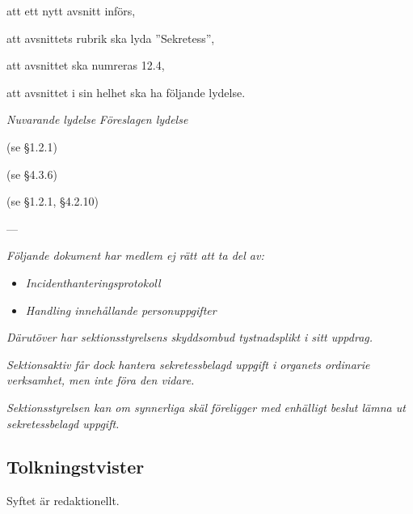 \documentclass{article}
\newenvironment{lydelse}
    {\begin{paracol}{2}%
        \emph{Nuvarande lydelse}%
        \switchcolumn%
        \emph{Föreslagen lydelse}%
    \end{paracol}%
    \begin{enumerate}[label=\thesubsection.\arabic*]%
    \begin{paracol}{2}%
    }{\end{paracol}\end{enumerate}}
\begin{document}
\begin{dels}
    \item att ett nytt avsnitt införs,
    \item att avsnittets rubrik ska lyda ''Sekretess'',
    \item att avsnittet ska numreras 12.4,
    \item att avsnittet i sin helhet ska ha följande lydelse.
\end{dels}
\begin{lydelse}
    
    \item[] (se \S 1.2.1)
    
    \vspace{4.4em}
    \item[] (se \S4.3.6)
    
    \vspace{1.4em}
    \item[] (se \S1.2.1, \S4.2.10)
    
    \vspace{2.4em}
    \item[] ---
    
    \switchcolumn
  
    \item \emph{Följande dokument har medlem ej rätt att ta del av:}
    \begin{itemize}
        \item \emph{Incidenthanteringsprotokoll}
        \item \emph{Handling innehållande personuppgifter}
    \end{itemize}
    
    \item \emph{Därutöver har sektionsstyrelsens skyddsombud tystnadsplikt i sitt uppdrag.}
    
    \item \emph{Sektionsaktiv får dock hantera sekretessbelagd uppgift i organets ordinarie verksamhet, men inte föra den vidare.}
    
    \item \emph{Sektionsstyrelsen kan om synnerliga skäl föreligger med enhälligt beslut lämna ut sekretessbelagd uppgift.}

\end{lydelse}
\subsection{Tolkningstvister}
Syftet är redaktionellt. 
\end{document}
